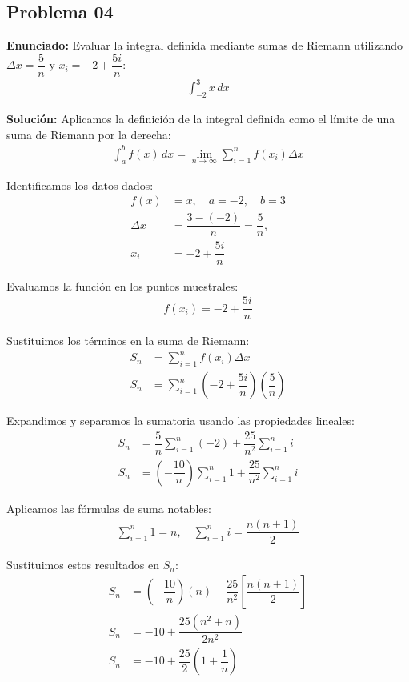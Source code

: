 \subsection*{Problema 04}

\textbf{Enunciado:} Evaluar la integral definida 
mediante sumas de Riemann utilizando 
$\Delta x = \dfrac{5}{n}$ y 
$x_i = -2 + \dfrac{5i}{n}$:
\begin{align*}
\int_{-2}^{3} x \, dx
\end{align*}

\textbf{Solución:} 
Aplicamos la definición de la integral 
definida como el límite de una suma de 
Riemann por la derecha:
\begin{align*}
\int_{a}^{b} f(x) \, dx = \lim_{n \to \infty} 
\sum_{i=1}^{n} f(x_i) \Delta x
\end{align*}

Identificamos los datos dados:
\begin{align*}
f(x) &= x, \quad a = -2, \quad b = 3 \\
\Delta x &= \dfrac{3 - (-2)}{n} = \dfrac{5}{n}, \\
x_i &= -2 + \dfrac{5i}{n}
\end{align*}

Evaluamos la función en los puntos muestrales:
\begin{align*}
f(x_i) = -2 + \dfrac{5i}{n}
\end{align*}

Sustituimos los términos en la suma de 
Riemann:
\begin{align*}
S_n &= \sum_{i=1}^{n} f(x_i) \Delta x \\
S_n &= \sum_{i=1}^{n} \left( -2 + \dfrac{5i}{n} \right) \left( \dfrac{5}{n} \right)
\end{align*}

Expandimos y separamos la sumatoria usando 
las propiedades lineales:
\begin{align*}
S_n &= \dfrac{5}{n} \sum_{i=1}^{n} (-2) 
+ \dfrac{25}{n^2} \sum_{i=1}^{n} i \\
S_n &= \left( -\dfrac{10}{n} \right) \sum_{i=1}^{n} 1 
+ \dfrac{25}{n^2} \sum_{i=1}^{n} i
\end{align*}

Aplicamos las fórmulas de suma notables:
\begin{align*}
\sum_{i=1}^{n} 1 = n, \quad 
\sum_{i=1}^{n} i = \dfrac{n(n+1)}{2}
\end{align*}

Sustituimos estos resultados en $S_n$:
\begin{align*}
S_n &= \left( -\dfrac{10}{n} \right) (n) 
+ \dfrac{25}{n^2} \left[ \dfrac{n(n+1)}{2} \right] \\
S_n &= -10 + \dfrac{25(n^2 + n)}{2n^2} \\
S_n &= -10 + \dfrac{25}{2} \left( 1 + \dfrac{1}{n} \right)
\end{align*}

